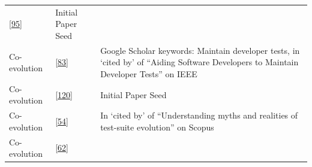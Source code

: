 \documentclass[]{book}
\begin{document}
\begin{longtable}[]{@{}lll@{}}
\begin{minipage}[t]{0.41\columnwidth}
{[}\protect\hyperlink{ref-pinto2012understanding}{95}{]}\strut
\end{minipage} & \begin{minipage}[t]{0.32\columnwidth}\raggedright\strut
Initial Paper Seed\strut
\end{minipage}\tabularnewline
\begin{minipage}[t]{0.19\columnwidth}\raggedright\strut
Co-evolution\strut
\end{minipage} & \begin{minipage}[t]{0.41\columnwidth}\raggedright\strut
{[}\protect\hyperlink{ref-marsavina2014}{83}{]}\strut
\end{minipage} & \begin{minipage}[t]{0.32\columnwidth}\raggedright\strut
Google Scholar keywords: Maintain developer tests, in `cited by' of
``Aiding Software Developers to Maintain Developer Tests'' on IEEE\strut
\end{minipage}\tabularnewline
\begin{minipage}[t]{0.19\columnwidth}\raggedright\strut
Co-evolution\strut
\end{minipage} & \begin{minipage}[t]{0.41\columnwidth}\raggedright\strut
{[}\protect\hyperlink{ref-zaidman2011studying}{120}{]}\strut
\end{minipage} & \begin{minipage}[t]{0.32\columnwidth}\raggedright\strut
Initial Paper Seed\strut
\end{minipage}\tabularnewline
\begin{minipage}[t]{0.19\columnwidth}\raggedright\strut
Co-evolution\strut
\end{minipage} & \begin{minipage}[t]{0.41\columnwidth}\raggedright\strut
{[}\protect\hyperlink{ref-greiler2013}{54}{]}\strut
\end{minipage} & \begin{minipage}[t]{0.32\columnwidth}\raggedright\strut
In `cited by' of ``Understanding myths and realities of test-suite
evolution'' on Scopus\strut
\end{minipage}\tabularnewline
\begin{minipage}[t]{0.19\columnwidth}\raggedright\strut
Co-evolution\strut
\end{minipage} & \begin{minipage}[t]{0.41\columnwidth}\raggedright\strut
{[}\protect\hyperlink{ref-hurdugaci2012}{62}{]}\strut
\end{minipage} & \begin{minipage}[t]{0.32\columnwidth}\raggedright\strut

\end{minipage}
\end{longtable}
\end{document}
